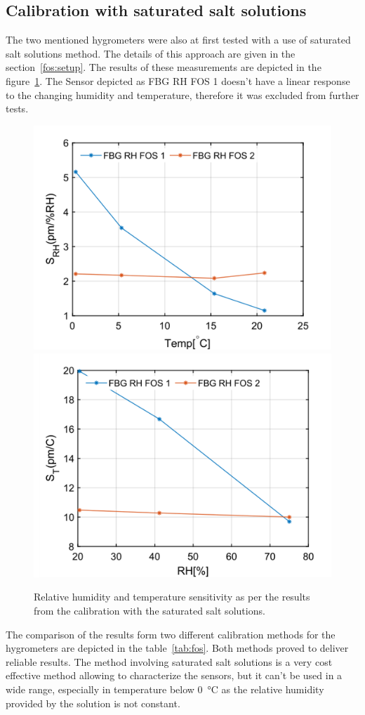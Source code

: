 \subsection{Calibration with saturated salt solutions}
The two mentioned hygrometers were also at first tested with a use of saturated salt solutions method. The details of this approach are given in the section~\ref{fos:setup}. The results of these measurements are depicted in the figure~\ref{fig:fos_salt}. The Sensor depicted as FBG RH FOS 1 doesn't have a linear response to the changing humidity and temperature, therefore it was excluded from further tests. 

\begin{figure}[!h]
\centering
\includegraphics[width=0.49\columnwidth]{Chapter5/images/salt_srh.png}
\includegraphics[width=0.49\columnwidth]{Chapter5/images/salt_st.png}
\caption{Relative humidity and temperature sensitivity as per the results from the calibration with the saturated salt solutions.}
\label{fig:fos_salt}
\end{figure}

The comparison of the results form two different calibration methods for the hygrometers are depicted in the table~\ref{tab:fos}. Both methods proved to deliver reliable results. The method involving saturated salt solutions is a very cost effective method allowing to characterize the sensors, but it can't be used in a wide range, especially in temperature below \SI{0}{\celsius} as the relative humidity provided by the solution is not constant. 

